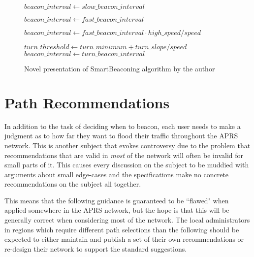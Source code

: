 \begin{figure}[p]
	\begin{algorithmic}[1]
	\State $beacon\_interval\gets slow\_beacon\_interval$

\Else
		\State $beacon\_interval\gets fast\_beacon\_interval$    

	\Else
		\State $beacon\_interval\gets fast\_beacon\_interval \cdot high\_speed / speed$

	\EndIf


	\State $turn\_threshold\gets turn\_minimum + turn\_slope / speed$
		\State $beacon\_interval\gets turn\_beacon\_interval$

	\EndIf
\EndIf

	\State {}

\EndIf
\end{algorithmic}
\caption{Novel presentation of SmartBeaconing algorithm by the author}
\label{fig:kwfsmartbeacon}
\end{figure}


\section{Path Recommendations}

In addition to the task of deciding when to beacon,
each user needs to make a judgment as to how far they want to flood their
traffic throughout the APRS network.
This is another subject that evokes controversy due to the problem that
recommendations that
are valid in \emph{most} of the network will often be invalid for small parts
of it.
This causes every discussion on the subject to be muddied with arguments
about small edge-cases and the specifications make no concrete recommendations
on the subject all together.

This means that the following guidance is guaranteed to be ``flawed" when
applied somewhere in the APRS network, but the hope is that this will
be generally correct when considering most of the network.
The local administrators in regions which require different path selections 
than the following should be expected to either 
maintain and publish a set of their own
recommendations or re-design their network to support the standard suggestions.

